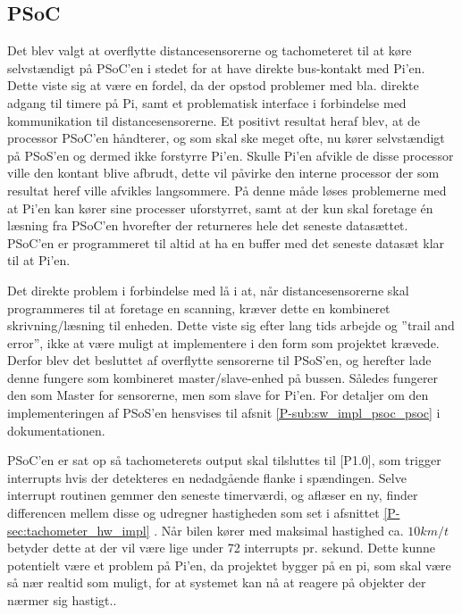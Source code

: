 \subsection{PSoC} \label{sec:swd_psoc_board}

Det blev valgt at overflytte distancesensorerne og tachometeret til at køre selvstændigt på PSoC'en i stedet for at have direkte bus-kontakt med Pi'en. 
Dette viste sig at være en fordel, da der opstod problemer med bla. direkte adgang til timere på Pi, samt et problematisk interface i forbindelse med \IIC kommunikation til distancesensorerne.
Et positivt resultat heraf blev, at de processor PSoC'en håndterer, og som skal ske meget ofte, nu kører selvstændigt på PSoS'en og dermed ikke forstyrre Pi'en.
Skulle Pi'en afvikle de disse processor ville den kontant blive afbrudt, dette vil påvirke den interne processor der som resultat heref ville afvikles langsommere.
På denne måde løses problemerne med at Pi'en kan kører sine processer uforstyrret, samt at der kun skal foretage én læsning fra PSoC'en hvorefter der returneres hele det seneste datasættet. 
PSoC'en er programmeret til altid at ha en buffer med det seneste datasæt klar til at Pi'en. 

Det direkte problem i forbindelse med \IIC lå i at, når distancesensorerne skal programmeres til at foretage en scanning, kræver dette en kombineret skrivning/læsning til enheden. 
Dette viste sig efter lang tids arbejde og ''trail and error'', ikke at være muligt at implementere i den form som projektet krævede. 
Derfor blev det besluttet af overflytte sensorerne til PSoS'en, og herefter lade denne fungere som kombineret master/slave-enhed på \IIC bussen. 
Således fungerer den som Master for sensorerne, men som slave for Pi'en. For detaljer om den implementeringen af PSoS'en hensvises til afsnit \ref{P-sub:sw_impl_psoc_psoc}  i dokumentationen.

PSoC'en er sat op så tachometerets output skal tilsluttes til [P1.0], som trigger interrupts hvis der detekteres en nedadgående flanke i spændingen. 
Selve interrupt routinen gemmer den seneste timerværdi, og aflæser en ny, finder differencen mellem disse og udregner hastigheden som set i afsnittet \ref{P-sec:tachometer_hw_impl} . 
Når bilen kører med maksimal hastighed ca. $10km/t$ betyder dette at der vil være lige under 72 interrupts pr. sekund. 
Dette kunne potentielt være et problem på Pi'en, da projektet bygger på en pi, som skal være så nær realtid som muligt, for at systemet kan nå at reagere på objekter der nærmer sig hastigt..


